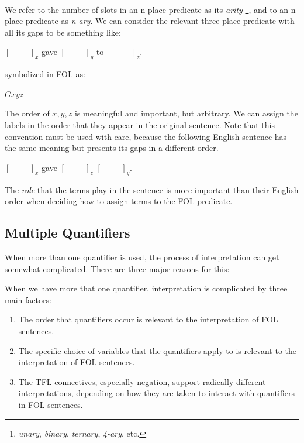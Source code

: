 We refer to the number of slots in an n-place predicate as its \emph{arity}
\footnote{\emph{unary}, \emph{binary}, \emph{ternary}, \emph{4-ary}, etc.},
and to an n-place predicate as \emph{n-ary}. We can consider the relevant
three-place predicate with all its gaps to be something like:

\begin{center}
  $[\hspace{1cm}]_x$ gave $[\hspace{1cm}]_y$ to $[\hspace{1cm}]_z$.
\end{center}

symbolized in FOL as:

\begin{center}
  $Gxyz$
\end{center}

The order of $x,y,z$ is meaningful and important, but arbitrary. We can assign
the labels in the order that they appear in the original sentence. Note
that this convention must be used with care, because the following English
sentence has the same meaning but presents its gaps in a different order.

\begin{center}
  $[\hspace{1cm}]_x$ gave $[\hspace{1cm}]_z$ $[\hspace{1cm}]_y$.
\end{center}

The \emph{role} that the terms play in the sentence is more important than their
English order when deciding how to assign terms to the FOL predicate.

\subsection{Multiple Quantifiers}

When more than one quantifier is used, the process of interpretation can get
somewhat complicated. There are three major reasons for this:

\begin{observation}
  When we have more that one quantifier, interpretation is complicated by three
  main factors:\\
  \begin{enumerate}
  \item The order that quantifiers occur is relevant to the interpretation of
    FOL sentences.
  \item The specific choice of variables that the quantifiers apply to is
    relevant to the interpretation of FOL sentences.
  \item The TFL connectives, especially negation, support radically different
    interpretations, depending on how they are taken to interact with
    quantifiers in FOL sentences.
  \end{enumerate}
\end{observation}

